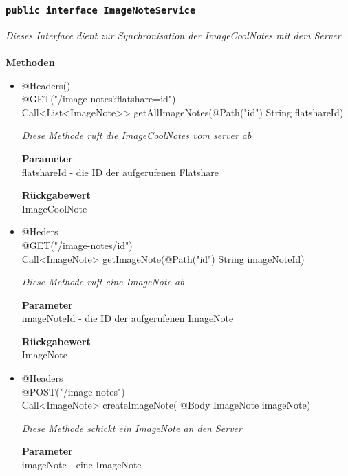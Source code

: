 \documentclass[a4paper]{scrreprt}
\begin{document}
             
             	\subsubsection{\texttt{public interface ImageNoteService }}
        \textit{Dieses Interface dient zur Synchronisation der ImageCoolNotes mit dem Server}\\
        \\
		\textbf{Methoden} \\
 			\begin{itemize}
        		\item{@Headers()\\ @GET("/image-notes?flatshare={id}")\\
   Call<List<ImageNote>> getAllImageNotes(@Path("id") String flatshareId)}
        	
        		\textit{Diese Methode ruft die ImageCoolNotes vom server ab}
        	
        		\textbf{Parameter} \\
                flatshareId - die ID der aufgerufenen Flatshare   
        		        	
       		 	\textbf{Rückgabewert} \\
                ImageCoolNote
      		  	 
      	      \item{@Heders\\ @GET("/image-notes/{id}")\\ Call<ImageNote> getImageNote(@Path("id") String imageNoteId)}
        	
      	 	 	\textit{Diese Methode ruft eine ImageNote ab }
        	
        		\textbf{Parameter} \\
        		 imageNoteId - die ID der aufgerufenen ImageNote  
        	
        		\textbf{Rückgabewert} \\
                ImageNote
                
                \item{@Headers\\ @POST("/image-notes")\\ Call<ImageNote> createImageNote( @Body ImageNote imageNote)}
        	
      	 	 	\textit{Diese Methode schickt ein ImageNote an den Server}
        	
        		\textbf{Parameter} \\
        		 imageNote - eine ImageNote  
        	

\end{itemize}
\end{document}
